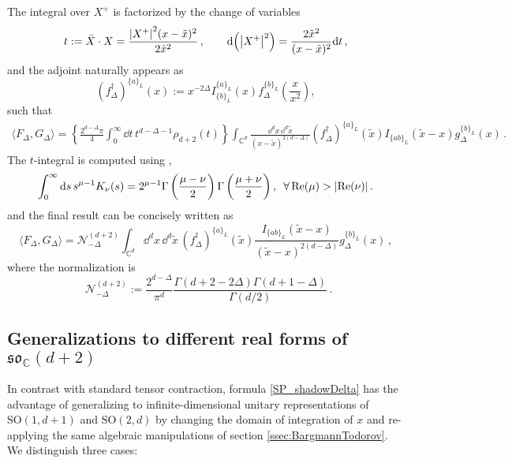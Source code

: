 \documentclass{article}
\def \Dg {\Delta}
\def \Cs {\mathbb{C}}
\begin{document}
The integral over $X^+$ is factorized by the change of variables 
\begin{equation}
t := \bar{X}\cdot X = \frac{\abs{X^+}^2 (x-\tilde{x})^2}{2 \tilde{x}^2}\,, \qquad \dd(\abs{X^+}^2) = \frac{2 \tilde{x}^2}{(x-\tilde{x})^2} \dd t\,,
\end{equation}
and the adjoint naturally appears as
\begin{equation}
(f_{\Dg}^{\dagger})^{\{a\}_L} (x) := x^{-2\Dg} I_{\{b\}_L}^{\{a\}_L}(x) f_{\Dg}^{\{b\}_L}\left(\frac{x}{x^2}\right), 
\end{equation}
such that 
\begin{align*}
\langle F_{\Dg}, G_{\Dg} \rangle = \left\{ \frac{2^{d-\Dg} \pi }{4} \int_0^{\infty} \dd t\, t^{d-\Dg-1} \rho_{d+2}(t) \right\} \int_{\Cs^d} \frac{\dd^d x\, \dd^d \tilde{x}}{(x-\tilde{x})^{2(d-\Dg)}} (f_{\Dg}^{\dagger})^{\{a\}_L} (\tilde{x}) I_{\{ab\}_L}(\tilde{x}-x) g_{\Dg}^{\{b\}_L} (x)\,.
\end{align*}
The $t$-integral is computed using \cite[Eq.~10.43.19]{dlmf}, 
\begin{equation}
\int_0^{\infty} \dd s \, s^{\mu-1} K_{\nu}(s) = 2^{\mu-1} \Gamma\left(\frac{\mu-\nu}{2} \right) \Gamma\left(\frac{\mu+\nu}{2} \right), \,\,\, \forall \, \mathrm{Re}(\mu) > \abs{\mathrm{Re}(\nu)}\,.
\end{equation}
and the final result can be concisely written as
\begin{equation}
\langle F_{\Dg}, G_{\Dg} \rangle = \mathcal{N}^{(d+2)}_{-\Dg} \int_{\Cs^d} \dd^d x \, \dd^d\tilde{x}\, (f_{\Dg}^{\dagger})^{\{a\}_L} (\tilde{x}) \frac{I_{\{ab \}_L}(\tilde{x}-x)}{(\tilde{x}-x)^{2(d-\Dg)}} g_{\Dg}^{\{b\}_L}(x)\,, 
\label{SP_shadowDelta}
\end{equation}
where the normalization is
\begin{equation}
\,\,\, \mathcal{N}^{(d+2)}_{-\Dg}:=\frac{2^{d-\Dg}}{\pi^d} \frac{\Gamma(d+2-2\Dg)\Gamma(d+1-\Dg)}{\Gamma(d/2)}\,.
\end{equation}

\subsection{Generalizations to different real forms of \texorpdfstring{$\mathfrak{so}_{\Cs}(d+2)$}{so(d+2;C)}}
\label{ssec:real_forms}
In contrast with standard tensor contraction, formula \eqref{SP_shadowDelta} has the advantage of generalizing to infinite-dimensional unitary representations of $\mathrm{SO}(1,d+1)$ and $\mathrm{SO}(2,d)$ by changing the domain of integration of $x$ and re-applying the same algebraic manipulations of section \ref{ssec:BargmannTodorov}. We distinguish three cases:
\end{document}
